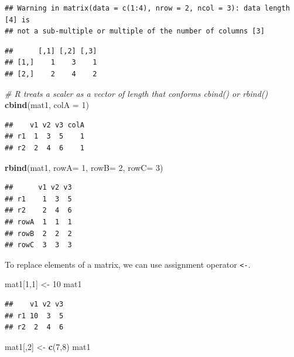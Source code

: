 \documentclass[]{book}
\newenvironment{Shaded}{\begin{snugshade}}{\end{snugshade}}
\newcommand{\KeywordTok}[1]{\textcolor[rgb]{0.13,0.29,0.53}{\textbf{{#1}}}}
\newcommand{\DataTypeTok}[1]{\textcolor[rgb]{0.13,0.29,0.53}{{#1}}}
\newcommand{\DecValTok}[1]{\textcolor[rgb]{0.00,0.00,0.81}{{#1}}}
\newcommand{\StringTok}[1]{\textcolor[rgb]{0.31,0.60,0.02}{{#1}}}
\newcommand{\CommentTok}[1]{\textcolor[rgb]{0.56,0.35,0.01}{\textit{{#1}}}}
\newcommand{\NormalTok}[1]{{#1}}
\theoremstyle{definition}
\theoremstyle{definition}
\theoremstyle{remark}
\begin{document}
\begin{verbatim}
## Warning in matrix(data = c(1:4), nrow = 2, ncol = 3): data length [4] is
## not a sub-multiple or multiple of the number of columns [3]
\end{verbatim}

\begin{verbatim}
##      [,1] [,2] [,3]
## [1,]    1    3    1
## [2,]    2    4    2
\end{verbatim}

\begin{Shaded}
\begin{Highlighting}[]
\CommentTok{# R treats a scaler as a vector of length that conforms cbind() or rbind()  }
\KeywordTok{cbind}\NormalTok{(mat1, }\DataTypeTok{colA =} \DecValTok{1}\NormalTok{)}
\end{Highlighting}
\end{Shaded}

\begin{verbatim}
##    v1 v2 v3 colA
## r1  1  3  5    1
## r2  2  4  6    1
\end{verbatim}

\begin{Shaded}
\begin{Highlighting}[]
\KeywordTok{rbind}\NormalTok{(mat1, }\DataTypeTok{rowA=} \DecValTok{1}\NormalTok{, }\DataTypeTok{rowB=} \DecValTok{2}\NormalTok{, }\DataTypeTok{rowC=} \DecValTok{3}\NormalTok{)}
\end{Highlighting}
\end{Shaded}

\begin{verbatim}
##      v1 v2 v3
## r1    1  3  5
## r2    2  4  6
## rowA  1  1  1
## rowB  2  2  2
## rowC  3  3  3
\end{verbatim}

To replace elements of a matrix, we can use assignment operator
\texttt{\textless{}-}.

\begin{Shaded}
\begin{Highlighting}[]
\NormalTok{mat1[}\DecValTok{1}\NormalTok{,}\DecValTok{1}\NormalTok{] <-}\StringTok{ }\DecValTok{10}
\NormalTok{mat1}
\end{Highlighting}
\end{Shaded}

\begin{verbatim}
##    v1 v2 v3
## r1 10  3  5
## r2  2  4  6
\end{verbatim}

\begin{Shaded}
\begin{Highlighting}[]
\NormalTok{mat1[,}\DecValTok{2}\NormalTok{] <-}\StringTok{ }\KeywordTok{c}\NormalTok{(}\DecValTok{7}\NormalTok{,}\DecValTok{8}\NormalTok{)}
\NormalTok{mat1}
\end{Highlighting}
\end{Shaded}
\end{document}
